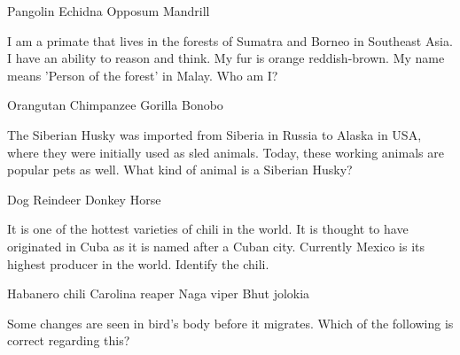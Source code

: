 \begin{questions}
    \begin{randomizeoneparchoices}
        \CorrectChoice Pangolin
        \choice Echidna
        \choice Opposum
        \choice Mandrill
    \end{randomizeoneparchoices}

\question I am a primate that lives in the forests of Sumatra and Borneo in Southeast Asia. I have an ability to reason and think. My fur is orange reddish-brown. My name means 'Person of the forest' in Malay. Who am I?

    \begin{randomizeoneparchoices}
        \CorrectChoice Orangutan
        \choice Chimpanzee
        \choice Gorilla
        \choice Bonobo
    \end{randomizeoneparchoices}

\question The Siberian Husky was imported from Siberia in Russia to Alaska in USA, where they were initially used as sled animals. Today, these working animals are popular pets as well. What kind of animal is a Siberian Husky?

    \begin{randomizeoneparchoices}
        \CorrectChoice Dog
        \choice Reindeer
        \choice Donkey
        \choice Horse
    \end{randomizeoneparchoices}

    \question It is one of the hottest varieties of chili in the world. It is thought to have originated in Cuba as it is named after a Cuban city. Currently Mexico is its highest producer in the world. Identify the chili.

    \begin{randomizeoneparchoices}
        \CorrectChoice Habanero chili
        \choice Carolina reaper
        \choice Naga viper
        \choice Bhut jolokia
    \end{randomizeoneparchoices}

\question Some changes are seen in bird's body before it migrates. Which of the following is correct regarding this?


\end{questions}
